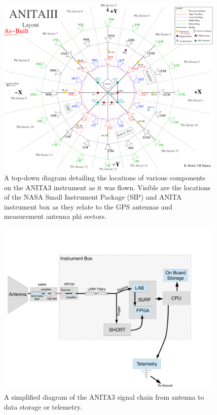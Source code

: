 \begin{figure}
\centering
	\includegraphics[width=\textwidth]{figures/ANITA3_layout_asBuilt}
	\caption{A top-down diagram detailing the locations of various components on the ANITA3 instrument as it was flown.  Visible are the locations of the NASA Small Instrument Package (SIP) and ANITA instrument box as they relate to the GPS antennas and measurement antenna phi sectors.}
	\label{fig:ANITA3_asBuilt}
\end{figure}

\begin{figure}
\centering
	\includegraphics[width=\textwidth]{figures/RFChainBlockDiagram}
	\caption{A simplified diagram of the ANITA3 signal chain from antenna to data storage or telemetry.}
	\label{fig:RFChainBlockDiagram}
\end{figure}

